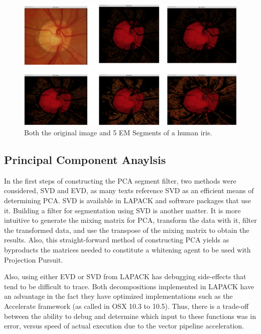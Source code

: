 \documentclass[11pt]{article}
\begin{document}
\begin{figure}[htbp] %
   \centering
   \includegraphics[width=6in]{fiveEmSegments.png} 
   \caption{Both the original image and 5 EM Segments of a human iris. }
   \label{fiveEmSegments}
\end{figure}

\subsection{Principal Component Anaylsis}\label{pca-classic-implementation}
In the first steps of constructing the PCA segment filter, two methods were considered, SVD and EVD, as many texts reference SVD as an efficient means of determining PCA.  %
SVD is available in LAPACK and software packages that use it.  Building a filter for segmentation using SVD is another matter.   It is more intuitive to generate the mixing matrix for PCA, transform the data with it, filter the transformed data, and use the transpose of the mixing matrix to obtain the results.   Also, this straight-forward %
method of constructing PCA yields as byproducts the matrices needed to constitute a %
whitening agent to be used with Projection Pursuit.    

Also, using either EVD or SVD from LAPACK has debugging side-effects that tend to be difficult to trace.  Both decompositions implemented in LAPACK have an advantage in the fact they have optimized implementations such as the Accelerate framework (as called in OSX 10.3 to 10.5).  Thus, there is a trade-off between the ability to debug and determine which input to these functions was in error, versus speed of actual execution due to the vector pipeline acceleration.  
\end{document}
